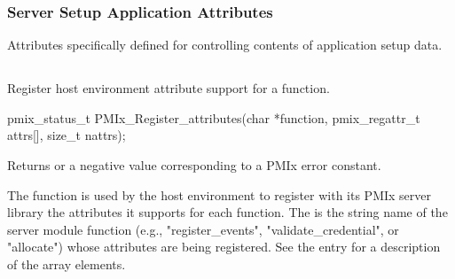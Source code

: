 \subsubsection{Server Setup Application Attributes}
\label{api:struct:attributes:security}

Attributes specifically defined for controlling contents of application setup data.

%
%
%


\subsection{}

\summary

Register host environment attribute support for a function.

\format

\cspecificstart
\begin{codepar}
pmix_status_t
PMIx_Register_attributes(char *function,
                         pmix_regattr_t attrs[],
                         size_t nattrs);
\end{codepar}
\cspecificend

\begin{arglist}
\end{arglist}

Returns  or a negative value corresponding to a PMIx error constant.

\descr

The  function is used by the host environment to register with its \ac{PMIx} server library the attributes it supports for each  function. The  is the string name of the server module function (e.g., "register_events", "validate_credential", or "allocate") whose attributes are being registered. See the  entry for a description of the  array elements.

